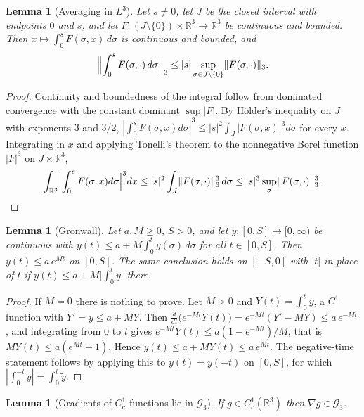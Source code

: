 \documentclass[11pt]{article}
\newtheorem{lemma}[theorem]{Lemma}
\theoremstyle{definition}
\theoremstyle{plain}
\newcommand{\R}{\mathbb R}
\newcommand{\norm}[1]{\lVert #1\rVert}
\begin{document}
\begin{lemma}[Averaging in $L^3$]\label{lem:qe-average}
Let $s\ne0$, let $J$ be the closed interval with endpoints $0$ and $s$, and
let $F:(J\setminus\{0\})\times\R^3\to\R^3$ be continuous and bounded.  Then
$x\mapsto\int_0^sF(\sigma,x)\,d\sigma$ is continuous and bounded, and
\[
 \Bigl\|\int_0^sF(\sigma,\cdot)\,d\sigma\Bigr\|_3
 \le|s|\sup_{\sigma\in J\setminus\{0\}}\norm{F(\sigma,\cdot)}_3 .
\]
\end{lemma}

\begin{proof}
Continuity and boundedness of the integral follow from dominated
convergence with the constant dominant $\sup|F|$.  By H\"older's inequality
on $J$ with exponents $3$ and $3/2$,
$|\int_0^sF(\sigma,x)d\sigma|^3\le|s|^2\int_J|F(\sigma,x)|^3d\sigma$ for
every $x$.  Integrating in $x$ and applying Tonelli's theorem to the
nonnegative Borel function $|F|^3$ on $J\times\R^3$,
\[
 \int_{\R^3}\Bigl|\int_0^sF(\sigma,x)d\sigma\Bigr|^3dx
 \le|s|^2\int_J\norm{F(\sigma,\cdot)}_3^3\,d\sigma
 \le|s|^3\sup_{\sigma}\norm{F(\sigma,\cdot)}_3^3 .
\]
\end{proof}

\begin{lemma}[Gronwall]\label{lem:qe-gronwall}
Let $a,M\ge0$, $S>0$, and let $y:[0,S]\to[0,\infty)$ be continuous with
$y(t)\le a+M\int_0^ty(\sigma)\,d\sigma$ for all $t\in[0,S]$.  Then
$y(t)\le a\,e^{Mt}$ on $[0,S]$.  The same conclusion holds on $[-S,0]$ with
$|t|$ in place of $t$ if $y(t)\le a+M\bigl|\int_0^ty\bigr|$ there.
\end{lemma}

\begin{proof}
If $M=0$ there is nothing to prove.  Let $M>0$ and $Y(t)=\int_0^ty$, a $C^1$
function with $Y'=y\le a+MY$.  Then
$\frac d{dt}\bigl(e^{-Mt}Y(t)\bigr)=e^{-Mt}(Y'-MY)\le a\,e^{-Mt}$, and
integrating from $0$ to $t$ gives $e^{-Mt}Y(t)\le a(1-e^{-Mt})/M$, that is
$MY(t)\le a(e^{Mt}-1)$.  Hence $y(t)\le a+MY(t)\le a\,e^{Mt}$.  The
negative-time statement follows by applying this to $\tilde y(t)=y(-t)$ on
$[0,S]$, for which $|\int_0^{-t}y|=\int_0^t\tilde y$.
\end{proof}

\begin{lemma}[Gradients of $C^1_c$ functions lie in $\mathcal G_3$]
\label{lem:qe-mollify}
If $g\in C^1_c(\R^3)$ then $\nabla g\in\mathcal G_3$.
\end{lemma}
\end{document}
